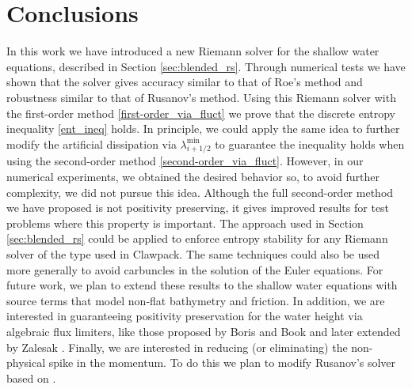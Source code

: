 \documentclass[preprint, 11pt]{article}
\begin{document}




\section{Conclusions}\label{sec:conclusion}
In this work we have introduced a new Riemann solver for the shallow water
equations, described in Section \ref{sec:blended_rs}.  Through numerical tests we have
shown that the solver gives accuracy similar to that of Roe's method and
robustness similar to that of Rusanov's method.
{\color{red}
  Using this Riemann solver with the first-order method \eqref{first-order_via_fluct} we
  prove that the discrete entropy inequality \eqref{ent_ineq} holds.
  In principle, we could apply the same idea to further modify the artificial dissipation
  via $\lambda^{\min}_{i+1/2}$ to guarantee the inequality holds when using the second-order method \eqref{second-order_via_fluct}. 
  However, in our numerical experiments, we obtained the desired behavior 
  so, to avoid further complexity, we did not pursue this idea. 
}
Although the full second-order method we have proposed is not 
positivity preserving, it gives improved results for test problems
where this property is important.  The approach used in Section
\ref{sec:blended_rs} could be applied to enforce entropy stability for any Riemann
solver of the type used in Clawpack.  The same techniques could also
be used more generally to avoid carbuncles in the solution of the
Euler equations.
{\color{OliveGreen}
  For future work, we plan to extend these results to the shallow water equations 
  with source terms that model non-flat bathymetry and friction. In addition, we 
  are interested in guaranteeing positivity preservation for the water height
  via algebraic flux limiters, like those proposed by Boris and Book \cite{boris1973flux} 
  and later extended by Zalesak \cite{zalesak1979fully}.
  Finally, we are interested in reducing (or eliminating) the non-physical spike in
  the momentum. To do this we plan to modify Rusanov's solver based on \cite[Section 5.1]{navas2019improved}. 
}
  
\end{document}
